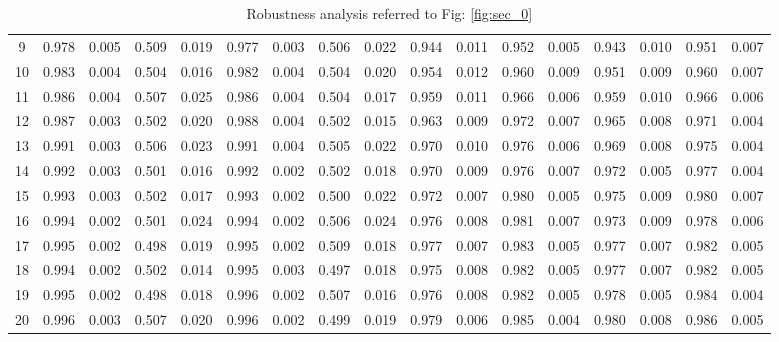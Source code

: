 \documentclass{article}
\begin{document}
\begin{table}[H]
{\begin{tabular}{|c|c|c|c|c|c|c|c|c|c|c|c|c|c|c|c|c|}
     9 & 0.978 & 0.005 & 0.509 & 0.019 & 0.977 & 0.003 & 0.506 & 0.022 & 0.944 & 0.011 & 0.952 & 0.005 & 0.943 & 0.010 & 0.951 & 0.007 \\ 
    10 & 0.983 & 0.004 & 0.504 & 0.016 & 0.982 & 0.004 & 0.504 & 0.020 & 0.954 & 0.012 & 0.960 & 0.009 & 0.951 & 0.009 & 0.960 & 0.007 \\ 
    11 & 0.986 & 0.004 & 0.507 & 0.025 & 0.986 & 0.004 & 0.504 & 0.017 & 0.959 & 0.011 & 0.966 & 0.006 & 0.959 & 0.010 & 0.966 & 0.006 \\ 
    12 & 0.987 & 0.003 & 0.502 & 0.020 & 0.988 & 0.004 & 0.502 & 0.015 & 0.963 & 0.009 & 0.972 & 0.007 & 0.965 & 0.008 & 0.971 & 0.004 \\ 
    13 & 0.991 & 0.003 & 0.506 & 0.023 & 0.991 & 0.004 & 0.505 & 0.022 & 0.970 & 0.010 & 0.976 & 0.006 & 0.969 & 0.008 & 0.975 & 0.004 \\ 
    14 & 0.992 & 0.003 & 0.501 & 0.016 & 0.992 & 0.002 & 0.502 & 0.018 & 0.970 & 0.009 & 0.976 & 0.007 & 0.972 & 0.005 & 0.977 & 0.004 \\ 
    15 & 0.993 & 0.003 & 0.502 & 0.017 & 0.993 & 0.002 & 0.500 & 0.022 & 0.972 & 0.007 & 0.980 & 0.005 & 0.975 & 0.009 & 0.980 & 0.007 \\ 
    16 & 0.994 & 0.002 & 0.501 & 0.024 & 0.994 & 0.002 & 0.506 & 0.024 & 0.976 & 0.008 & 0.981 & 0.007 & 0.973 & 0.009 & 0.978 & 0.006 \\ 
    17 & 0.995 & 0.002 & 0.498 & 0.019 & 0.995 & 0.002 & 0.509 & 0.018 & 0.977 & 0.007 & 0.983 & 0.005 & 0.977 & 0.007 & 0.982 & 0.005 \\ 
    18 & 0.994 & 0.002 & 0.502 & 0.014 & 0.995 & 0.003 & 0.497 & 0.018 & 0.975 & 0.008 & 0.982 & 0.005 & 0.977 & 0.007 & 0.982 & 0.005 \\ 
    19 & 0.995 & 0.002 & 0.498 & 0.018 & 0.996 & 0.002 & 0.507 & 0.016 & 0.976 & 0.008 & 0.982 & 0.005 & 0.978 & 0.005 & 0.984 & 0.004 \\ 
    20 & 0.996 & 0.003 & 0.507 & 0.020 & 0.996 & 0.002 & 0.499 & 0.019 & 0.979 & 0.006 & 0.985 & 0.004 & 0.980 & 0.008 & 0.986 & 0.005 \\ 
   \hline
\end{tabular}
}

\caption{Robustness analysis referred to Fig: \ref{fig:sec_0}}
\label{tab:sec_0}
\end{table} %
\end{document}
